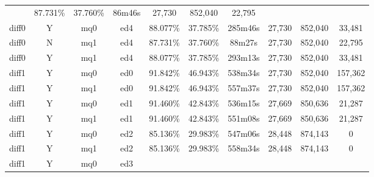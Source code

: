 \begin{sidewaystable}[!tp]
\begin{center}
\begin{tabular}{|c|c|c|c||c|c||c|c|c|c|}
	& 87.731\% & 37.760\%
	& 86m46s & 27,730
	& 852,040 & 22,795 \\
diff0 & Y & mq0 & ed4
	& 88.077\% & 37.785\%
	& 285m46s & 27,730
	& 852,040 & 33,481 \\
diff0 & N & mq1 & ed4
	& 87.731\% & 37.760\%
	& 88m27s & 27,730
	& 852,040 & 22,795 \\
diff0 & Y & mq1 & ed4
	& 88.077\% & 37.785\%
	& 293m13s & 27,730
	& 852,040 & 33,481 \\
diff1 & Y & mq0 & ed0
	& 91.842\% & 46.943\%
	& 538m34s & 27,730
	& 852,040 & 157,362 \\
diff1 & Y & mq1 & ed0
	& 91.842\% & 46.943\%
	& 557m37s & 27,730
	& 852,040 & 157,362 \\
diff1 & Y & mq0 & ed1
	& 91.460\% & 42.843\%
	& 536m15s & 27,669
	& 850,636 & 21,287 \\
diff1 & Y & mq1 & ed1
	& 91.460\% & 42.843\%
	& 551m08s & 27,669
	& 850,636 & 21,287 \\
diff1 & Y & mq0 & ed2
	& 85.136\% & 29.983\%
	& 547m06s & 28,448
	& 874,143 & 0 \\
diff1 & Y & mq1 & ed2
	& 85.136\% & 29.983\%
	& 558m34s & 28,448
	& 874,143 & 0 \\
diff1 & Y & mq0 & ed3

\end{tabular}
\end{center}
\end{sidewaystable}
